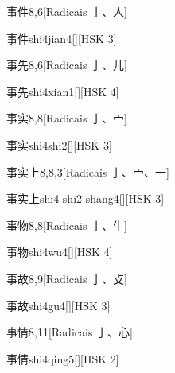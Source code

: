 \begin{entry}{事件}{8,6}[Radicais ⼅、⼈]
  \begin{phonetics}{事件}{shi4jian4}[][HSK 3]
  \end{phonetics}
\end{entry}

\begin{entry}{事先}{8,6}[Radicais ⼅、⼉]
  \begin{phonetics}{事先}{shi4xian1}[][HSK 4]
  \end{phonetics}
\end{entry}

\begin{entry}{事实}{8,8}[Radicais ⼅、⼧]
  \begin{phonetics}{事实}{shi4shi2}[][HSK 3]
  \end{phonetics}
\end{entry}

\begin{entry}{事实上}{8,8,3}[Radicais ⼅、⼧、⼀]
  \begin{phonetics}{事实上}{shi4 shi2 shang4}[][HSK 3]
  \end{phonetics}
\end{entry}

\begin{entry}{事物}{8,8}[Radicais ⼅、⽜]
  \begin{phonetics}{事物}{shi4wu4}[][HSK 4]
  \end{phonetics}
\end{entry}

\begin{entry}{事故}{8,9}[Radicais ⼅、⽁]
  \begin{phonetics}{事故}{shi4gu4}[][HSK 3]
  \end{phonetics}
\end{entry}

\begin{entry}{事情}{8,11}[Radicais ⼅、⼼]
  \begin{phonetics}{事情}{shi4qing5}[][HSK 2]
  \end{phonetics}
\end{entry}

